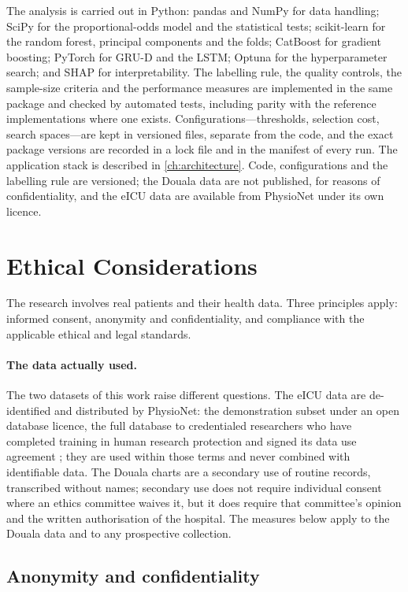 The analysis is carried out in Python: pandas and NumPy for data handling; SciPy for the proportional-odds model and the statistical tests; scikit-learn for the random forest, principal components and the folds; CatBoost for gradient boosting; PyTorch for GRU-D and the LSTM; Optuna for the hyperparameter search; and SHAP for interpretability. The labelling rule, the quality controls, the sample-size criteria and the performance measures are implemented in the same package and checked by automated tests, including parity with the reference implementations where one exists. Configurations---thresholds, selection cost, search spaces---are kept in versioned files, separate from the code, and the exact package versions are recorded in a lock file and in the manifest of every run. The application stack is described in \cref{ch:architecture}. Code, configurations and the labelling rule are versioned; the Douala data are not published, for reasons of confidentiality, and the eICU data are available from PhysioNet under its own licence.

\section{Ethical Considerations}\label{sec:ethics-considerations}

The research involves real patients and their health data. Three principles apply: informed consent, anonymity and confidentiality, and compliance with the applicable ethical and legal standards.

\paragraph{The data actually used.} The two datasets of this work raise different questions. The eICU data are de-identified and distributed by PhysioNet: the demonstration subset under an open database licence, the full database to credentialed researchers who have completed training in human research protection and signed its data use agreement \parencite{pollard2018,goldberger2000}; they are used within those terms and never combined with identifiable data. The Douala charts are a secondary use of routine records, transcribed without names; secondary use does not require individual consent where an ethics committee waives it, but it does require that committee's opinion and the written authorisation of the hospital. The measures below apply to the Douala data and to any prospective collection.

\subsection{Anonymity and confidentiality}\label{sec:ethics}\label{sec:reident}

